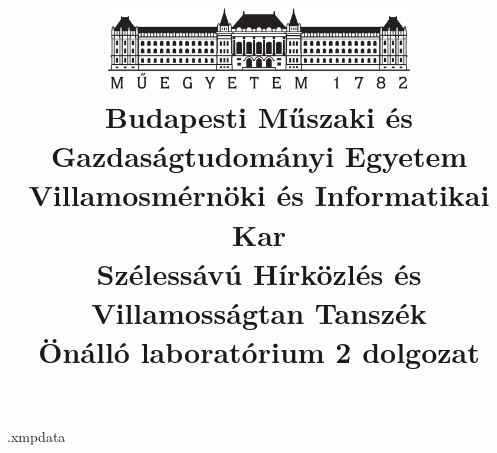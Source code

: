 \begin{filecontents*}[overwrite]{\jobname.xmpdata}
\end{filecontents*}

\documentclass[a4paper,12pt,titlepage]{article}
\usepackage{ucs}
\usepackage[T1]{fontenc}
\usepackage[utf8]{inputenc}
\usepackage[magyar]{babel}
\usepackage{amsfonts}
\usepackage{amsmath}
\usepackage{graphicx}
\usepackage[left=20mm,right=20mm,top=20mm,bottom=25mm]{geometry}
\usepackage{hyperref}
\usepackage{cite}
\usepackage{xcolor}
\usepackage[a-3u]{pdfx}

\pagestyle{plain} 

\listfiles %

\title{
    \centering
    \includegraphics[width=0.6\textwidth]{kep/bme_logo.pdf} \\
    \vspace{0.5cm}
    \large{\textbf{Budapesti Műszaki és Gazdaságtudományi Egyetem}\\
    \textbf{Villamosmérnöki és Informatikai Kar}\\
    \textbf{Szélessávú Hírközlés és Villamosságtan Tanszék}}\\
    \vspace{5cm}
    \huge{\textbf{Önálló laboratórium 2 dolgozat}} \\
    \vspace{3cm}
}


